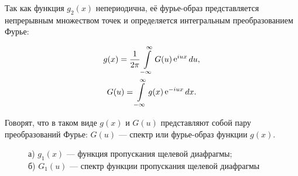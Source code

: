 \documentclass[a5paper,10pt, twoside]{article} %
\begin{document}
		Так	как функция	$g_2(x)$ непериодична, её фурье-образ представляется непрерывным множеством 
		точек и определяется интегральным преобразованием Фурье:
		
		\begin{equation}
			\begin{gathered} 
				g(x) = \frac{1}{2\pi} \int\limits_{-\infty}^{\infty} G(u) \mathop{\mathrm e}\nolimits^{iux} du,\\
				G(u) = \int\limits_{-\infty}^{\infty} g(x) \mathop{\mathrm e}\nolimits^{-iux} dx.
			 \end{gathered}
		\end{equation}
		
		Говорят, что в таком виде $g(x)$ и $G(u)$ представляют собой пару преобразований Фурье: 
		$G(u)$ — спектр или фурье-образ функции $g(x)$.
		
		\begin{figure}[h]
			\begin{minipage}[h]{0.4\linewidth}
			\end{minipage}
			\hfill
			\begin{minipage}[h]{0.6\linewidth}
			\end{minipage}
			\caption
			{
				а) $g_1 (x)$ — функция пропускания щелевой диафрагмы; \\
				б) $G_1 (u)$ — спектр функции пропускания щелевой диафрагмы
			}
			\label{ris:dia}
		\end{figure}
		
\end{document}
